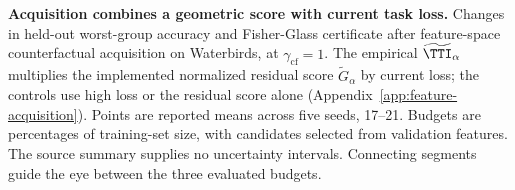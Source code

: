 \textbf{Acquisition combines a geometric score with current task loss.}
Changes in held-out worst-group accuracy and Fisher-Glass certificate after feature-space counterfactual acquisition on Waterbirds, at $\gamma_{\mathrm{cf}}=1$. The empirical $\widetilde{\TTI}_\alpha$ multiplies the implemented normalized residual score $\widetilde G_\alpha$ by current loss; the controls use high loss or the residual score alone (Appendix~\ref{app:feature-acquisition}). Points are reported means across five seeds, 17--21. Budgets are percentages of training-set size, with candidates selected from validation features. The source summary supplies no uncertainty intervals. Connecting segments guide the eye between the three evaluated budgets.
